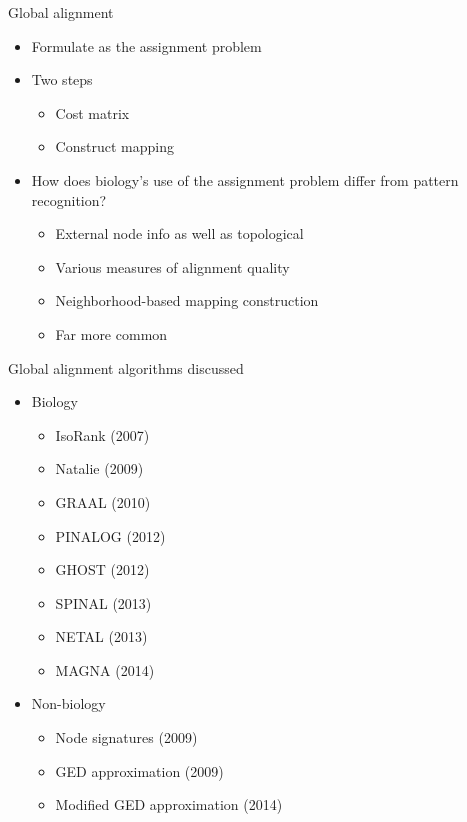 \documentclass[xcolor=dvipsnames, 14pt]{beamer}
\begin{document}
\begin{frame}{Global alignment}
\begin{itemize}
\item Formulate as the assignment problem
\pause
\item Two steps
\begin{itemize}
\item Cost matrix
\item Construct mapping
\end{itemize}
\pause
\item How does biology's use of the assignment problem differ from pattern recognition?
\pause
\begin{itemize}
\item External node info as well as topological
\item Various measures of alignment quality
\item Neighborhood-based mapping construction
\item Far more common
\end{itemize}
\end{itemize}
\end{frame}

\begin{frame}{Global alignment algorithms discussed}
\begin{itemize}
\item Biology
\begin{itemize}
\item IsoRank (2007) 
\item Natalie (2009) 
\item GRAAL (2010)
\item PINALOG (2012)
\item GHOST (2012)
\item SPINAL (2013)
\item NETAL (2013)
\item MAGNA (2014)
\end{itemize}
\item Non-biology
\begin{itemize}
\item Node signatures (2009)
\item GED approximation (2009)
\item Modified GED approximation (2014)
\end{itemize}
\end{itemize}
\end{frame}
\end{document}
